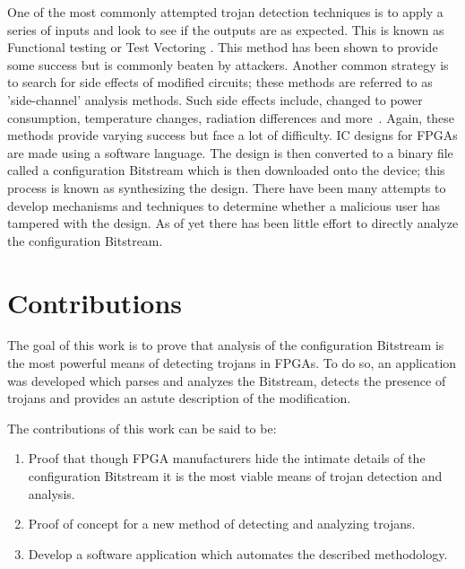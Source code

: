 One of the most commonly attempted trojan detection techniques is to apply a series of inputs and look to see if the outputs are as expected.
This is known as Functional testing or Test Vectoring \cite{kSubset,monteCarloTestPattern,towardsDetectionMethodology}.
This method has been shown to provide some success but is commonly beaten by attackers.
Another common strategy is to search for side effects of modified circuits; these methods are referred to as 'side-channel' analysis methods.
Such side effects include, changed to power consumption, temperature changes, radiation differences and more~\cite{sideChannelObfuscation, postLayout, controllableSleepTransistors, pcaAlgorithm}.
Again, these methods provide varying success but face a lot of difficulty.
\acrshort{IC} designs for \acrfull{FPGAs} are made using a software language.
The design is then converted to a binary file called a configuration \gls{Bitstream} which is then downloaded onto the device; this process is known as synthesizing the design.
There have been many attempts to develop mechanisms and techniques to determine whether a malicious user has tampered with the design.
As of yet there has been little effort to directly analyze the configuration \gls{Bitstream}.
\section{Contributions}
The goal of this work is to prove that analysis of the configuration \gls{Bitstream} is the most powerful means of detecting trojans in \acrshort{FPGA}s.
To do so, an application was developed which parses and analyzes the \gls{Bitstream}, detects the presence of trojans and provides an astute description of the modification.

The contributions of this work can be said to be:
\begin{enumerate}
	\item Proof that though \acrshort{FPGA} manufacturers hide the intimate details of the configuration \gls{Bitstream} it is the most viable means of trojan detection and analysis. 
	\item Proof of concept for a new method of detecting and analyzing trojans.
	\item Develop a software application which automates the described methodology.
\end{enumerate}
